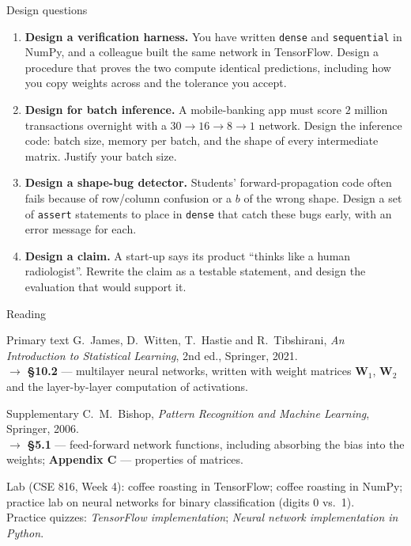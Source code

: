 \documentclass[aspectratio=169,10pt]{beamer}
\begin{document}
\begin{frame}{Design questions}
  \footnotesize
  \begin{enumerate}
    \item \textbf{Design a verification harness.} You have written \texttt{dense} and
          \texttt{sequential} in NumPy, and a colleague built the same network in
          TensorFlow. Design a procedure that proves the two compute identical predictions,
          including how you copy weights across and the tolerance you accept. \hfill{}
    \item \textbf{Design for batch inference.} A mobile-banking app must score
          $2$ million transactions overnight with a $30\to16\to8\to1$ network. Design the
          inference code: batch size, memory per batch, and the shape of every intermediate
          matrix. Justify your batch size. \hfill{}
    \item \textbf{Design a shape-bug detector.} Students' forward-propagation code often
          fails because of row/column confusion or a $b$ of the wrong shape. Design a set of
          \texttt{assert} statements to place in \texttt{dense} that catch these bugs early,
          with an error message for each. \hfill{}
    \item \textbf{Design a claim.} A start-up says its product ``thinks like a human
          radiologist''. Rewrite the claim as a testable statement, and design the evaluation
          that would support it. \hfill{}
  \end{enumerate}
\end{frame}

\begin{frame}{Reading}
  \begin{block}{Primary text}
    G.~James, D.~Witten, T.~Hastie and R.~Tibshirani,
    \emph{An Introduction to Statistical Learning}, 2nd ed., Springer, 2021.\\[2pt]
    \hfill{\small$\rightarrow$ \textbf{\S10.2} --- multilayer neural networks, written with
    weight matrices $\mathbf{W}_1$, $\mathbf{W}_2$ and the layer-by-layer computation of
    activations.}
  \end{block}
  \begin{block}{Supplementary}
    C.~M.~Bishop, \emph{Pattern Recognition and Machine Learning}, Springer, 2006.\\[2pt]
    \hfill{\small$\rightarrow$ \textbf{\S5.1} --- feed-forward network functions, including
    absorbing the bias into the weights; \textbf{Appendix C} --- properties of matrices.}
  \end{block}
  \vspace{1mm}
  \begin{center}
    \small\color{cugray}
    Lab (CSE 816, Week 4): coffee roasting in TensorFlow; coffee roasting in NumPy;
    practice lab on neural networks for binary classification (digits 0 vs.\ 1).\\
    Practice quizzes: \emph{TensorFlow implementation}; \emph{Neural network implementation
    in Python}.
  \end{center}
\end{frame}
\end{document}
